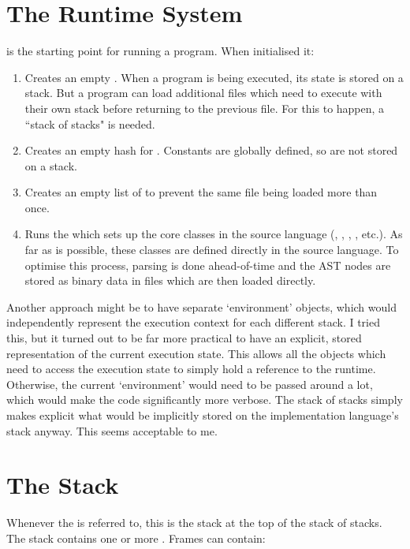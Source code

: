 \section{The Runtime System}

 is the starting point for running a program. When initialised it:

\begin{enumerate}
  \item Creates an empty . When a program is being executed, its state is stored on a stack. But a program can load additional files which need to execute with their own stack before returning to the previous file. For this to happen, a ``stack of stacks" is needed.
  \item Creates an empty hash for . Constants are globally defined, so are not stored on a stack.
  \item Creates an empty list of  to prevent the same file being loaded more than once.
  \item Runs the  which sets up the core classes in the source language (, , , , etc.). As far as is possible, these classes are defined directly in the source language. To optimise this process, parsing is done ahead-of-time and the AST nodes are stored as binary data in files which are then loaded directly.
\end{enumerate}

Another approach might be to have separate `environment' objects, which would independently represent the execution context for each different stack. I tried this, but it turned out to be far more practical to have an explicit, stored representation of the current execution state. This allows all the objects which need to access the execution state to simply hold a reference to the runtime. Otherwise, the current `environment' would need to be passed around a lot, which would make the code significantly more verbose. The stack of stacks simply makes explicit what would be implicitly stored on the implementation language's stack anyway. This seems acceptable to me.

\section{The Stack}

Whenever the  is referred to, this is the stack at the top of the stack of stacks. The stack contains one or more . Frames can contain:

